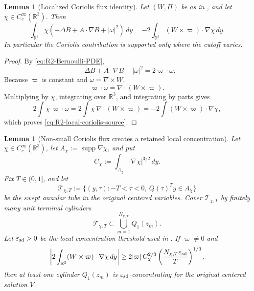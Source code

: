 \documentclass[11pt]{amsart}
\numberwithin{equation}{section}
\theoremstyle{plain}
\newtheorem{lemma}[theorem]{Lemma}
\theoremstyle{definition}
\theoremstyle{remark}
\newcommand{\eps}{\varepsilon}
\begin{document}
\begin{lemma}[Localized Coriolis flux identity]
\label{lem:R2-coriolis-flux-localization}
Let \((W,\Pi)\) be as in , and let
\(\chi\in C_c^\infty(\mathbb R^3)\).  Then
\begin{equation}\label{eq:R2-local-coriolis-source}
   \int_{\mathbb R^3}\chi
   \left(
      -\Delta B+A\cdot\nabla B+|\omega|^2
   \right)\,dy
   =
   -2\int_{\mathbb R^3}(W\times\varpi)\cdot\nabla\chi\,dy .
\end{equation}
In particular the Coriolis contribution is supported only where the cutoff
varies.
\end{lemma}

\begin{proof}
By \eqref{eq:R2-Bernoulli-PDE},
\[
   -\Delta B+A\cdot\nabla B+|\omega|^2=2\varpi\cdot\omega .
\]
Because \(\varpi\) is constant and \(\omega=\nabla\times W\),
\[
   \varpi\cdot\omega
   =
   \nabla\cdot(W\times\varpi).
\]
Multiplying by \(\chi\), integrating over \(\mathbb R^3\), and integrating by
parts gives
\[
   2\int\chi\,\varpi\cdot\omega
   =
   2\int\chi\,\nabla\cdot(W\times\varpi)
   =
   -2\int(W\times\varpi)\cdot\nabla\chi ,
\]
which proves \eqref{eq:R2-local-coriolis-source}.
\end{proof}

\begin{lemma}[Non-small Coriolis flux creates a retained local concentration]
\label{lem:R2-annular-flux-active-concentration}
Let \(\chi\in C_c^\infty(\mathbb R^3)\), let
\(A_\chi:=\operatorname{supp}\nabla\chi\), and put
\[
   C_\chi:=\int_{A_\chi}|\nabla\chi|^{3/2}\,dy .
\]
Fix \(T\in(0,1]\), and let
\[
   \mathcal T_{\chi,T}
   :=
   \{(y,\tau): -T<\tau<0,\ Q(\tau)^Ty\in A_\chi\}
\]
be the swept annular tube in the original centered variables.  Cover
\(\mathcal T_{\chi,T}\) by finitely many unit terminal cylinders
\[
   \mathcal T_{\chi,T}\subset \bigcup_{m=1}^{N_{\chi,T}}Q_1(z_m).
\]
Let \(\eps_{\rm sd}>0\) be the local concentration threshold used in
.  If \(\varpi\ne0\) and
\begin{equation}\label{eq:R2-flux-active-threshold}
   \left|
      2\int_{\mathbb R^3}(W\times\varpi)\cdot\nabla\chi\,dy
   \right|
   \ge
   2|\varpi|\,C_\chi^{2/3}
      \left(\frac{N_{\chi,T}\eps_{\rm sd}}{T}\right)^{1/3},
\end{equation}
then at least one cylinder \(Q_1(z_m)\) is \(\eps_{\rm sd}\)-concentrating for the original
centered solution \(V\).
\end{lemma}
\end{document}
